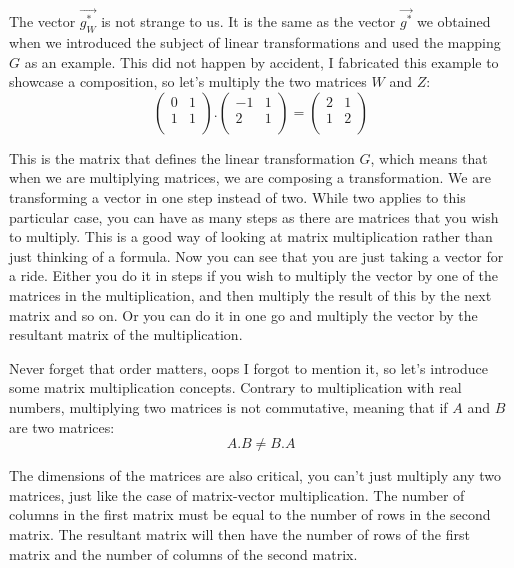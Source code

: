 \documentclass[a4,12pt,twosided,openany]{memoir}
\begin{document}
The vector $\overrightarrow{g_W^*}$ is not strange to us. It is the same as the vector $\overrightarrow{g^*}$ we obtained when we introduced the subject of linear transformations and used the mapping $G$ as an example. This  did not happen by accident, I fabricated this example to showcase a composition, so let's multiply the two matrices $W$ and $Z$:
\[\begin{pmatrix}
0 & 1\\
1 & 1 \\
\end{pmatrix}.
\begin{pmatrix}
-1 & 1 \\
2 & 1 \\
\end{pmatrix} = \begin{pmatrix}
2 & 1 \\
1 & 2 \\
\end{pmatrix}
\]
\par 
\indent
This is the matrix that defines the linear transformation $G$, which means that when we are multiplying matrices, we are composing a transformation. We are transforming a vector in one step instead of two. While two applies to this particular case, you can have as many steps as there are matrices that you wish to multiply. This is a good way of looking at matrix multiplication rather than just thinking of a formula. Now you can see that you are just taking a vector for a ride. Either you do it in steps if you wish to multiply the vector by one of the matrices in the multiplication, and then multiply the result of this by the next matrix and so on. Or you can do it in one go and multiply the vector by the resultant matrix of the multiplication.
\par 
\indent
Never forget that order matters, oops I forgot to mention it, so let’s introduce some matrix multiplication concepts. Contrary to multiplication with real numbers, multiplying two matrices is not commutative, meaning that if $A$ and $B$ are two matrices:
\[A.B \neq B.A\]
\par 
\indent
The dimensions of the matrices are also critical, you can’t just multiply any two matrices, just like the case of matrix-vector multiplication. The number of columns in the first matrix must be equal to the number of rows in the second matrix. The resultant matrix will then have  the number of rows of the first matrix and the number of columns of the second matrix.
\end{document}

